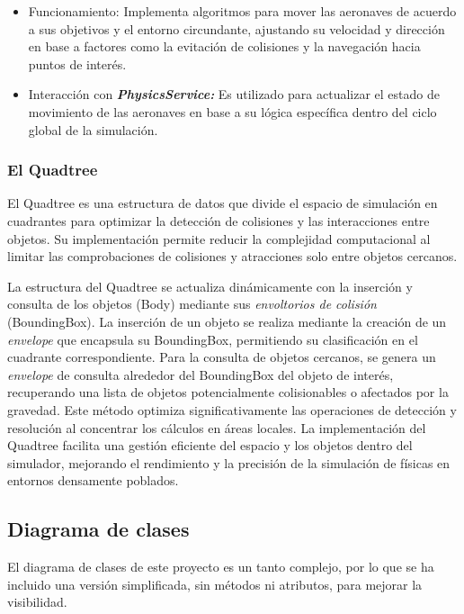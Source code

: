 \begin{itemize}
\begin{itemize}
        \item Funcionamiento: Implementa algoritmos para mover las aeronaves de acuerdo a sus objetivos y el entorno circundante, ajustando su velocidad y dirección en base a factores como la evitación de colisiones y la navegación hacia puntos de interés.
        \item Interacción con \textbf{\textit{PhysicsService:}} Es utilizado para actualizar el estado de movimiento de las aeronaves en base a su lógica específica dentro del ciclo global de la simulación.
    \end{itemize}
\end{itemize}
\subsubsection{El Quadtree}
El Quadtree es una estructura de datos que divide el espacio de simulación en cuadrantes para optimizar la detección de colisiones y las interacciones entre objetos. Su implementación permite reducir la complejidad computacional al limitar las comprobaciones de colisiones y atracciones solo entre objetos cercanos.

La estructura del Quadtree se actualiza dinámicamente con la inserción y consulta de los objetos (Body) mediante sus \textit{envoltorios de colisión} (BoundingBox). La inserción de un objeto se realiza mediante la creación de un \textit{envelope} que encapsula su BoundingBox, permitiendo su clasificación en el cuadrante correspondiente.
Para la consulta de objetos cercanos, se genera un \textit{envelope} de consulta alrededor del BoundingBox del objeto de interés, recuperando una lista de objetos potencialmente colisionables o afectados por la gravedad. Este método optimiza significativamente las operaciones de detección y resolución al concentrar los cálculos en áreas locales.
La implementación del Quadtree facilita una gestión eficiente del espacio y los objetos dentro del simulador, mejorando el rendimiento y la precisión de la simulación de físicas en entornos densamente poblados.
\subsection{Diagrama de clases}
El diagrama de clases de este proyecto es un tanto complejo, por lo que se ha incluido una versión simplificada, sin métodos ni atributos, para mejorar la visibilidad.

